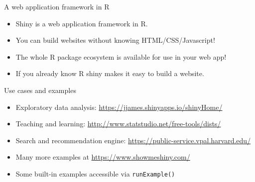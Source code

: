 \documentclass[
  12pt,
  ignorenonframetext,
]{beamer}
\providecommand{\tightlist}{%
  \setlength{\itemsep}{0pt}\setlength{\parskip}{0pt}}
\begin{document}
\begin{frame}{A web application framework in R}
\protect\hypertarget{a-web-application-framework-in-r}{}

\begin{itemize}[<+->]
\tightlist
\item
  Shiny is a web application framework in R.
\end{itemize}

\begin{itemize}[<+->]
\tightlist
\item
  You can build websites without knowing HTML/CSS/Javascript!
\end{itemize}

\begin{itemize}[<+->]
\tightlist
\item
  The whole R package ecosystem is available for use in your web app!
\end{itemize}

\begin{itemize}[<+->]
\tightlist
\item
  If you already know R shiny makes it easy to build a website.
\end{itemize}

\end{frame}

\begin{frame}[fragile]{Use cases and examples}
\protect\hypertarget{use-cases-and-examples}{}

\begin{itemize}
\item
  Exploratory data analysis:
  \url{https://jjames.shinyapps.io/shinyHome/}
\item
  Teaching and learning:
  \url{http://www.statstudio.net/free-tools/dists/}
\item
  Search and recommendation engine:
  \url{https://public-service.vpal.harvard.edu/}
\end{itemize}

\begin{itemize}[<+->]
\tightlist
\item
  Many more examples at \url{https://www.showmeshiny.com/}
\end{itemize}

\begin{itemize}[<+->]
\tightlist
\item
  Some built-in examples accessible via \texttt{runExample()}
\end{itemize}

\end{frame}
\end{document}
